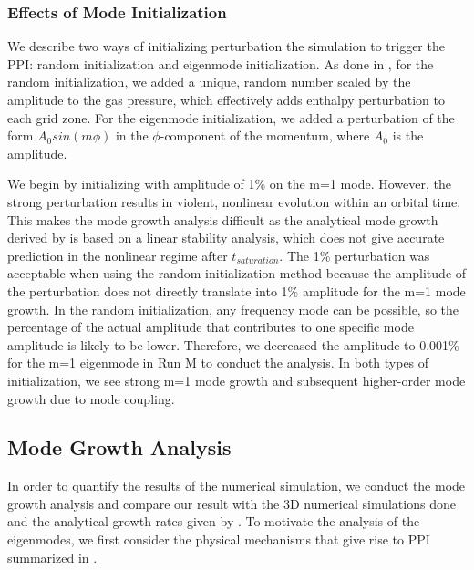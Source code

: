 \documentclass[iop,revtex4]{emulateapj}
\begin{document}
 \subsubsection{Effects of Mode Initialization}
\par  We describe two ways of initializing perturbation the simulation to trigger the \ac{PPI}: random initialization and eigenmode initialization. As done in  \cite{Hawley:1991A}, for the random initialization, we added a unique, random number scaled by the amplitude to the gas pressure, which effectively adds enthalpy perturbation to each grid zone. For the eigenmode initialization, we added a perturbation of the form $A_0 sin(m\phi)$ in the $\phi$-component of the momentum, where $A_0$ is the amplitude.
\par We begin by initializing with amplitude of 1\% on the m=1 mode. However, the strong perturbation results in violent, nonlinear evolution within an orbital time. This makes the mode growth analysis difficult as the analytical mode growth derived by \cite{Goldreich:1986A} is based on a linear stability analysis, which does not give accurate prediction in the nonlinear regime after $t_{saturation}$. The 1\% perturbation was acceptable when using the random initialization method because the amplitude of the perturbation does not directly translate into 1\% amplitude for the m=1 mode growth. In the random initialization,  any frequency mode can be possible, so the percentage of the actual amplitude that contributes to one specific mode amplitude is likely to be lower. Therefore, we decreased the amplitude to 0.001\% for the m=1 eigenmode in Run M to conduct the analysis. In both types of initialization, we see strong m=1 mode growth and subsequent higher-order mode growth due to mode coupling.
\subsection{Mode Growth Analysis}
In order to quantify the results of the numerical simulation, we conduct the mode growth analysis and compare our result with the 3D numerical simulations done \cite{Hawley:1991A} and the analytical growth rates given by \cite{Goldreich:1986A}. To motivate the analysis of the eigenmodes, we first consider the physical mechanisms that give rise to \ac{PPI} summarized in \cite{Narayan:1989A}.
\end{document}
